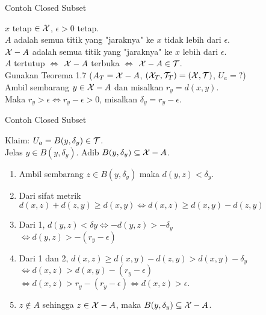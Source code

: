 \begin{frame}{Contoh Closed Subset}
    \begin{tcolorbox}[enhanced,title=Contoh 39 (Analisa), frame style tile={width=\paperwidth}{\wallpaper}]
        $x$ tetap $\in \mathcal{X}$, $\epsilon >0$ tetap.\\
        $A$ adalah semua titik yang "jaraknya" ke $x$ tidak lebih dari $\epsilon$.\\
        $\mathcal{X} - A$ adalah semua titik yang "jaraknya" ke $x$ lebih dari $\epsilon$.\\
        $A$ tertutup $\iff$ $\mathcal{X}-A$ terbuka $\iff$ $\mathcal{X}-A \in \mathcal{T}$.\\
        Gunakan Teorema 1.7 ($A_T = \mathcal{X} - A$, $({\mathcal{X}}_T,{\mathcal{T}}_T) = (\mathcal{X} ,\mathcal{T})$, $U_a =?$)\\
        Ambil sembarang $y\in \mathcal{X}-A$ dan misalkan $r_y = d(x,y)$.\\
        Maka $r_y > \epsilon \iff r_y - \epsilon > 0$, misalkan $\delta_y=r_y-\epsilon$.
    \end{tcolorbox}
\end{frame}

\begin{frame}{Contoh Closed Subset}
    \begin{tcolorbox}[enhanced,title=Contoh 39 (Analisa), frame style tile={width=\paperwidth}{\wallpaper}]
        Klaim: $U_a = B(y,\delta_y) \in \mathcal{T}$.\\
        Jelas $y \in B(y, \delta_y)$. Adib $B(y,\delta_y) \subseteq \mathcal{X}-A$.
        \begin{enumerate}
            \item Ambil sembarang $z \in B(y, \delta_y)$ maka $d(y,z) < \delta_y$.\\
            \item Dari sifat metrik $d(x,z)+d(z,y) \geq d(x,y) \iff d(x,z) \geq d(x,y)-d(z,y)$\\
            \item Dari 1, $d(y,z) < \delta y \iff -d(y,z) > -\delta_y$\\$\iff d(y,z) > -(r_y-\epsilon)$
            \item Dari 1 dan 2, $d(x,z) \geq d(x,y)-d(z,y) > d(x,y)-\delta_y$\\
            $\iff d(x,z) > d(x,y) - (r_y-\epsilon)$\\$\iff d(x,z) > r_y - (r_y-\epsilon) \iff d(x,z) > \epsilon$.
            \item $z \notin A$ sehingga $z \in \mathcal{X} - A$, maka $B(y,\delta_y) \subseteq \mathcal{X}-A$.
        \end{enumerate}
        
    \end{tcolorbox}
\end{frame}

